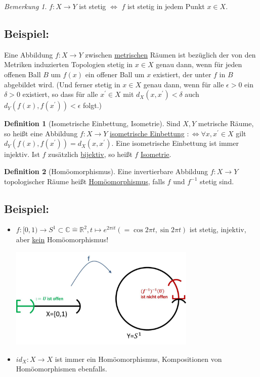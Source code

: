 \documentclass[a4paper,11pt,notitlepage]{report}
\theoremstyle{remark}
\newtheorem{remark}{Bemerkung}[chapter]
\theoremstyle{definition}
\newtheorem{definition}{Definition}[chapter]
\newcommand{\R}{{\ensuremath{\mathbb{R}}}}
\newcommand{\C}{{\ensuremath{\mathbb{C}}}}
\newenvironment{bsp}[1]
{
\setlength{\fboxsep}{10pt}
\subsection*{Beispiel: #1}
\begin{upshape}
}
{
\end{upshape}
}
\begin{document}
\begin{remark}
	$f \colon X \rightarrow Y$ ist stetig $\Leftrightarrow$ $f$ ist stetig in jedem Punkt $x \in X$.
\end{remark}

\begin{bsp}{}
	Eine Abbildung $f \colon X \rightarrow Y$ zwischen \underline{metrischen} Räumen ist bezüglich der von den Metriken induzierten Topologien stetig in $x \in X$ genau dann, wenn für jeden offenen Ball $B$ um $f(x)$ ein offener Ball um $x$ existiert, der unter $f$ in $B$ abgebildet wird. (Und ferner stetig in $x \in X$ genau dann, wenn für alle $\epsilon > 0$ ein $\delta > 0$ existiert, so dass für alle $x^\prime \in X$ mit $d_X(x,x^\prime) < \delta$ auch $d_Y \left( f(x), f(x^\prime) \right) < \epsilon$ folgt.) 
\end{bsp}

\begin{definition}[Isometrische Einbettung, Isometrie]
	Sind $X,Y$ metrische Räume, so heißt eine Abbildung $f \colon X \rightarrow Y$ \underline{isometrische Einbettung}
	\newline	
	 $: \Leftrightarrow \forall x, x^\prime \in X$ gilt $d_Y \left ( f(x), f(x^\prime) \right ) = d_X (x, x^\prime)$.
	\newline
	Eine isometrische Einbettung ist immer injektiv.
	\newline
	Ist $f$ zusätzlich \underline{bijektiv}, so heißt $f$ \underline{\underline{Isometrie}}. 
\end{definition}

\begin{definition}[Homöomorphismus]
	Eine invertierbare Abbildung $f \colon X \rightarrow Y$ topologischer Räume heißt \underline{Homöomorphismus}, falls $f$ und $f^{-1}$ stetig sind.
\end{definition}

\begin{bsp}{}
	\begin{itemize}
		\item $f \colon [0,1) \rightarrow S^1 \subset \C \hat{=} \R^2, t \mapsto e^{2 \pi i t} (= \cos {2 \pi t}, \sin {2 \pi t})$ ist stetig, injektiv, aber \underline{kein} Homöomorphismus!
		\begin{center}
		\includegraphics[width=0.7\textwidth]{images/0_1_nach_S1_f-1_nicht_stetig.jpg}
		\end{center}
		\item $id_X \colon X \rightarrow X$ ist immer ein Homöomorphismus, Kompositionen von Homöomorphismen ebenfalls.
	\end{itemize}
\end{bsp}
\end{document}
